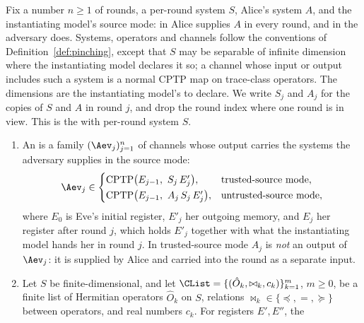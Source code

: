 \begin{definition}\label{def:round-model}
Fix a number $n\geq1$ of rounds, a per-round system $S$, Alice's system $A$,
and the instantiating model's source mode: in  Alice
supplies $A$ in every round, and in  the adversary
does. Systems, operators and channels follow the conventions of
Definition~\ref{def:pinching}, except that $S$ may be separable of infinite
dimension where the instantiating model declares it so; a channel whose input
or output includes such a system is a normal CPTP map on trace-class
operators. The dimensions are the instantiating model's to declare. We write
$S_j$ and $A_j$ for the copies of $S$ and $A$ in round $j$, and drop the
round index where one round is in view. This is the  with
per-round system $S$.
\begin{enumerate}[label=(\roman*),leftmargin=2.4em]
\item An  is a family $(\Aev_j)_{j=1}^{n}$ of channels whose output carries
  the systems the adversary supplies in the source mode:
  \begin{equation}\label{eq:round-attack}
    \Aev_j\in
    \begin{cases}
      \mathrm{CPTP}\big(E_{j-1},\ S_j\,E'_j\big),
        & \text{trusted-source mode},\\[0.3ex]
      \mathrm{CPTP}\big(E_{j-1},\ A_j\,S_j\,E'_j\big),
        & \text{untrusted-source mode},
    \end{cases}
  \end{equation}
  where $E_0$ is Eve's initial register, $E'_j$ her outgoing memory, and
  $E_j$ her register after round $j$, which holds $E'_j$ together with what
  the instantiating model hands her in round $j$. In trusted-source mode $A_j$
  is \emph{not} an output of $\Aev_j$: it is supplied by Alice and carried
  into the round as a separate input.
\item Let $S$ be finite-dimensional, and let
  $\CList=\{(\hat O_k,\bowtie_k,c_k)\}_{k=1}^{m}$, $m\geq0$, be a
  finite list of Hermitian operators $\hat O_k$ on $S$, relations
  $\bowtie_k\in\{\preceq,=,\succeq\}$ between operators, and real numbers
  $c_k$. For registers $E',E''$, the 
\end{enumerate}
\end{definition}
